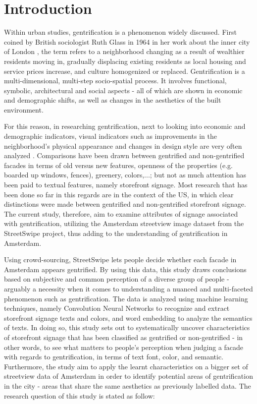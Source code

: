 \section{Introduction}
\label{sec:introduction}

Within urban studies, gentrification is a phenomenon widely discussed. First coined by British sociologist Ruth Glass in 1964 in her work about the inner city of London \cite{Glass1964}, the term refers to a neighborhood changing as a result of wealthier residents moving in, gradually displacing existing residents as local housing and service prices increase, and culture homogenized or replaced. Gentrification is a multi-dimensional, multi-step socio-spatial process. It involves functional, symbolic, architectural and social aspects \cite{döring_ulbricht_2018} - all of which are shown in economic and demographic shifts, as well as changes in the aesthetics of the built environment.

For this reason, in researching gentrification, next to looking into economic and demographic indicators, visual indicators such as improvements in the neighborhood's physical appearance and changes in design style are very often analyzed \cite{huang2022, ravuri2022, naik2017, ilic2019}. Comparisons have been drawn between gentrified and non-gentrified facades in terms of old versus new features, openness of the properties (e.g. boarded up windows, fences), greenery, colors,...; but not as much attention has been paid to textual features, namely storefront signage. Most research that has been done so far in this regards are in the context of the US, in which clear distinctions were made between gentrified and non-gentrified storefront signage. The current study, therefore, aim to examine attributes of signage associated with gentrification, utilizing the Amsterdam streetview image dataset from the StreetSwipe project, thus adding to the understanding of gentrification in Amsterdam.

Using crowd-sourcing, StreetSwipe \cite{streetswipe} lets people decide whether each facade in Amsterdam appears gentrified. By using this data, this study draws conclusions based on subjective and common perception of a diverse group of people - arguably a necessity when it comes to understanding a nuanced and multi-faceted phenomenon such as gentrification. The data is analyzed using machine learning techniques, namely Convolution Neural Networks to recognize and extract storefront signage texts and colors, and word embedding to analyze the semantics of texts. In doing so, this study sets out to systematically uncover characteristics of storefront signage that has been classified as gentrified or non-gentrified - in other words, to see what matters to people's perception when judging a facade with regards to gentrification, in terms of text font, color, and semantic. Furthermore, the study aim to apply the learnt characteristics on a bigger set of streetview data of Amsterdam in order to identify potential areas of gentrification in the city - areas that share the same aesthetics as previously labelled data. The research question of this study is stated as follow: 

